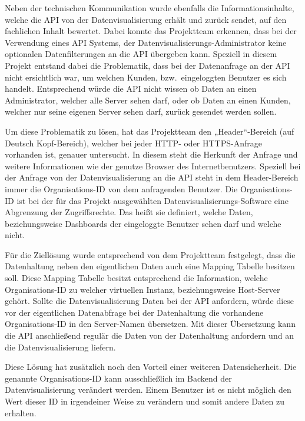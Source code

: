 Neben der technischen Kommunikation wurde ebenfalls die Informationsinhalte,
welche die API von der Datenvisualisierung erhält und zurück sendet, auf den
fachlichen Inhalt bewertet. Dabei konnte das Projektteam erkennen, dass bei der
Verwendung eines API Systems, der Datenvisualisierungs\hyp{}Administrator keine
optionalen Datenfilterungen an die API übergeben kann. Speziell in diesem
Projekt entstand dabei die Problematik, dass bei der Datenanfrage an der API
nicht ersichtlich war, um welchen Kunden, bzw.\ eingeloggten Benutzer es sich
handelt. Entsprechend würde die API nicht wissen ob Daten an einen
Administrator, welcher alle Server sehen darf, oder ob Daten an einen Kunden,
welcher nur seine eigenen Server sehen darf, zurück gesendet werden sollen.

Um diese Problematik zu lösen, hat das Projektteam den „Header“\hyp{}Bereich
(auf Deutsch Kopf\hyp{}Bereich), welcher bei jeder \gls{HTTP}- oder
\gls{HTTPS}\hyp{}Anfrage vorhanden ist, genauer untersucht. In diesem steht die
Herkunft der Anfrage und weitere Informationen wie der genutze Browser des
Internetbenutzers. Speziell bei der Anfrage von der Datenvisualisierung an die
API steht in dem Header\hyp{}Bereich immer die Organisations\hyp{}ID von dem
anfragenden Benutzer. Die Organisations\hyp{}ID ist bei der für das Projekt
ausgewählten Datenvisualisierungs\hyp{}Software eine Abgrenzung der
Zugriffsrechte. Das heißt sie definiert, welche Daten, beziehungsweise
Dashboards der eingeloggte Benutzer sehen darf und welche nicht.

Für die Ziellösung wurde entsprechend von dem Projektteam festgelegt, dass die
Datenhaltung neben den eigentlichen Daten auch eine Mapping Tabelle besitzen
soll. Diese Mapping Tabelle besitzt entsprechend die Information, welche
Organisations\hyp{}ID zu welcher virtuellen Instanz, beziehungsweise
Host\hyp{}Server gehört. Sollte die Datenvisualisierung Daten bei der API
anfordern, würde diese vor der eigentlichen Datenabfrage bei der Datenhaltung
die vorhandene Organisations\hyp{}ID in den Server\hyp{}Namen übersetzen. Mit
dieser Übersetzung kann die API anschließend regulär die Daten von der
Datenhaltung anfordern und an die Datenvisualisierung liefern.

Diese Lösung hat zusätzlich noch den Vorteil einer weiteren Datensicherheit.
Die genannte Organisations\hyp{}ID kann ausschließlich im Backend der
Datenvisualisierung verändert werden. Einem Benutzer ist es nicht möglich den
Wert dieser ID in irgendeiner Weise zu verändern und somit andere Daten zu
erhalten.
\nl%

